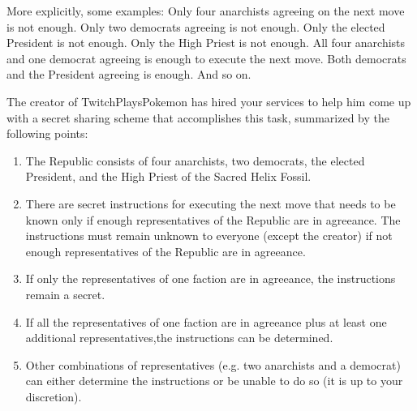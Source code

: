 \documentclass[]{article}
\begin{document}
\begin{qunlist}
  More explicitly, some examples: 
  Only four anarchists agreeing on the next move is not enough. 
  Only two democrats agreeing is not enough. 
  Only the elected President is not enough. 
  Only the High Priest is not enough. 
  All four anarchists and one democrat agreeing is enough to execute the next move.
  Both democrats and the President agreeing is enough.
  And so on.

  The creator of TwitchPlaysPokemon has hired your services to help him come up with a secret sharing scheme that accomplishes this task, summarized by the following points:

  \begin{enumerate}
  \item
    The Republic consists of four anarchists, two democrats, the elected President, and the High Priest of the Sacred Helix Fossil.

  \item
    There are secret instructions for executing the next move that needs to be known only if enough representatives of the Republic are in agreeance.
    The instructions must remain unknown to everyone (except the creator) if not enough representatives of the Republic are in agreeance.

  \item
    If only the representatives of one faction are in agreeance, the instructions remain a secret.

  \item
    If all the representatives of one faction are in agreeance plus at least one additional representatives,the instructions can be determined.

  \item
    Other combinations of representatives (e.g. two anarchists and a democrat) can either determine the instructions or be unable to do so (it is up to your discretion). 
  \end{enumerate}

\end{qunlist}
\end{document}
